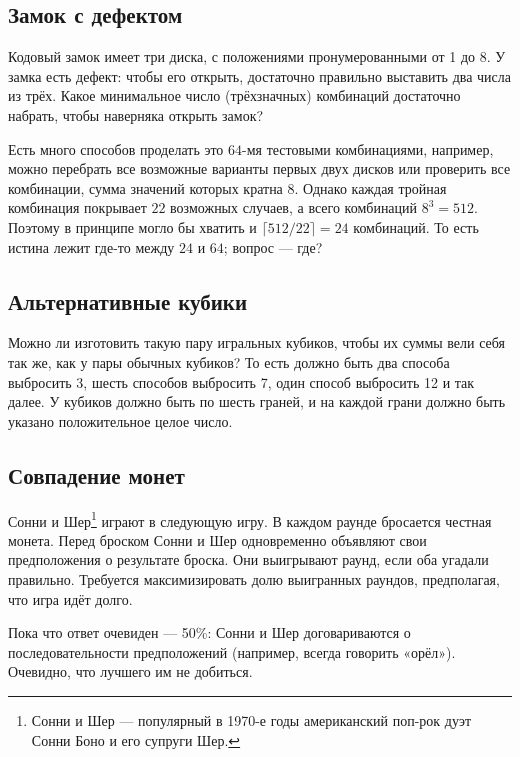 \subsection*{Замок с дефектом}\label{Замок с дефектом}

Кодовый замок имеет три диска, с положениями пронумерованными от 1 до 8.
У замка есть дефект: чтобы его открыть, достаточно правильно выставить два числа из трёх.
Какое минимальное число (трёхзначных) комбинаций достаточно набрать, чтобы наверняка открыть замок?

Есть много способов проделать это $64$-мя тестовыми комбинациями, например, можно перебрать все возможные варианты первых двух дисков или проверить все комбинации, сумма значений которых кратна 8.
Однако каждая тройная комбинация покрывает $22$ возможных случаев, а всего комбинаций $8^3 = 512$.
Поэтому в принципе могло бы хватить и $\lceil 512/22 \rceil = 24$ комбинаций.
То есть истина лежит где-то между $24$ и $64$; вопрос --- где?

\subsection*{Альтернативные кубики}

 
Можно ли изготовить такую пару игральных кубиков, чтобы их суммы вели себя так же, как у пары обычных кубиков?
То есть должно быть два способа выбросить 3, шесть способов выбросить 7, один способ выбросить 12 и так далее.
У кубиков должно быть по шесть граней, и на каждой грани должно быть указано положительное целое число.

\subsection*{Совпадение монет}

Сонни и Шер\footnote{Сонни и Шер --- популярный в 1970-е годы американский поп-рок дуэт Сонни Боно и его супруги Шер.\pr} играют в следующую игру.
В каждом раунде бросается честная монета.
Перед броском Сонни и Шер одновременно объявляют свои предположения о результате броска.
Они выигрывают раунд, если оба угадали правильно.
Требуется максимизировать долю выигранных раундов, предполагая, что игра идёт долго.

Пока что ответ очевиден --- 50\%: Сонни и Шер договариваются о последовательности предположений (например, всегда говорить «орёл»).
Очевидно, что лучшего им не добиться.

